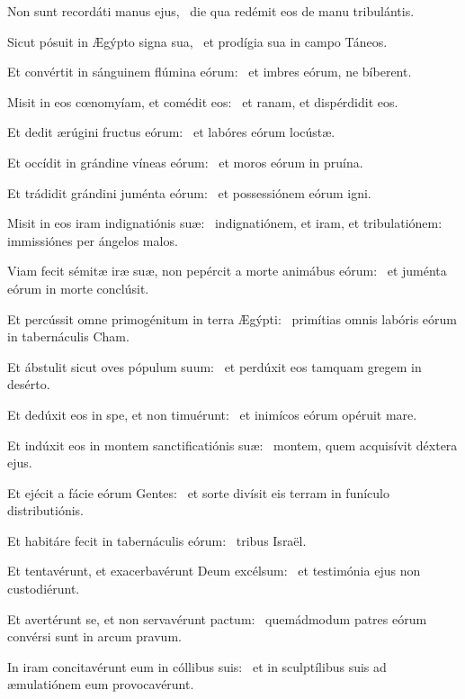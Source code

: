 
\item Non sunt recordáti manus ejus,~\psstar{} die qua redémit eos de manu tribulántis.

\item Sicut pósuit in Ægýpto signa sua,~\psstar{} et prodígia sua in campo Táneos.

\item Et convértit in sánguinem flúmina eórum:~\psstar{} et imbres eórum, ne bíberent.

\item Misit in eos cœnomyíam, et comédit eos:~\psstar{} et ranam, et dispérdidit eos.

\item Et dedit ærúgini fructus eórum:~\psstar{} et labóres eórum locústæ.

\item Et occídit in grándine víneas eórum:~\psstar{} et moros eórum in pruína.

\item Et trádidit grándini juménta eórum:~\psstar{} et possessiónem eórum igni.

\item Misit in eos iram indignatiónis suæ:~\psstar{} indignatiónem, et iram, et tribulatiónem: immissiónes per ángelos malos.

\item Viam fecit sémitæ iræ suæ, non pepércit a morte animábus eórum:~\psstar{} et juménta eórum in morte conclúsit.

\item Et percússit omne primogénitum in terra Ægýpti:~\psstar{} primítias omnis labóris eórum in tabernáculis Cham.

\item Et ábstulit sicut oves pópulum suum:~\psstar{} et perdúxit eos tamquam gregem in desérto.

\item Et dedúxit eos in spe, et non timuérunt:~\psstar{} et inimícos eórum opéruit mare.

\item Et indúxit eos in montem sanctificatiónis suæ:~\psstar{} montem, quem acquisívit déxtera ejus.

\item Et ejécit a fácie eórum Gentes:~\psstar{} et sorte divísit eis terram in funículo distributiónis.

\item Et habitáre fecit in tabernáculis eórum:~\psstar{} tribus Israël.

\item Et tentavérunt, et exacerbavérunt Deum excélsum:~\psstar{} et testimónia ejus non custodiérunt.

\item Et avertérunt se, et non servavérunt pactum:~\psstar{} quemádmodum patres eórum convérsi sunt in arcum pravum.

\item In iram concitavérunt eum in cóllibus suis:~\psstar{} et in sculptílibus suis ad æmulatiónem eum provocavérunt.

